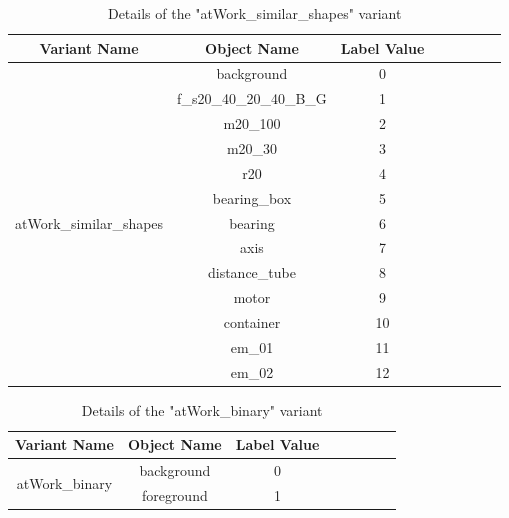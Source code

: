 \begin{itemize}
		\begin{table}[!htb]
			\centering
			\begin{tabular}{|c|c|c|c|c|c|c|c|}
			\hline 
  			\textbf{Variant Name} & \textbf{Object Name} & \textbf{Label Value} \\ 
			\hline
			\multirow{13}{*}{atWork\_similar\_shapes} & background & 0 \\ 
			\cline{2-3}%
			 & f\_s20\_40\_20\_40\_B\_G & 1 \\
			\cline{2-3}
			& m20\_100 & 2 \\
			\cline{2-3} 
			& m20\_30 & 3 \\
			\cline{2-3} 
			& r20 & 4 \\
			\cline{2-3} 
			& bearing\_box & 5 \\
			\cline{2-3} 
			& bearing & 6 \\
			\cline{2-3} 
			& axis & 7 \\
			\cline{2-3} 
			& distance\_tube & 8 \\
			\cline{2-3} 
			& motor & 9 \\
			\cline{2-3} 
			& container & 10 \\
			\cline{2-3} 
			& em\_01 & 11 \\
			\cline{2-3} 
			& em\_02 & 12 \\
			\hline
			\end{tabular}
			\caption{Details of the "atWork\_similar\_shapes" variant} 
			\label{Table:shape}
		\end{table}
		
		\begin{table}[!htb]
			\centering
			\begin{tabular}{|c|c|c|c|c|c|c|c|}
			\hline 
  			\textbf{Variant Name} & \textbf{Object Name} & \textbf{Label Value} \\ 
			\hline
			\multirow{2}{*}{atWork\_binary} & background & 0 \\ 
			\cline{2-3}%
			 & foreground & 1 \\
			\hline
			\end{tabular}
			\caption{Details of the "atWork\_binary" variant} 
			\label{Table:binary}
		\end{table}

	\end{itemize}

